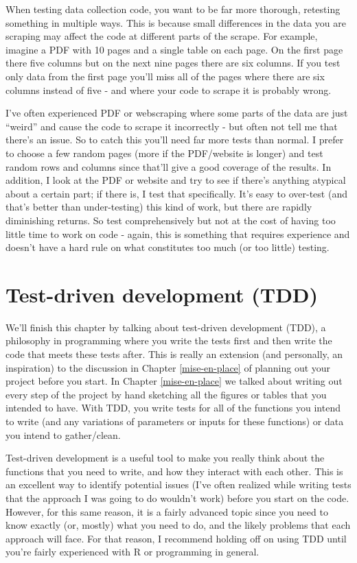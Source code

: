 \documentclass[
]{krantz}
\begin{document}
When testing data collection code, you want to be far more thorough, retesting something in multiple ways. This is because small differences in the data you are scraping may affect the code at different parts of the scrape. For example, imagine a PDF with 10 pages and a single table on each page. On the first page there five columns but on the next nine pages there are six columns. If you test only data from the first page you'll miss all of the pages where there are six columns instead of five - and where your code to scrape it is probably wrong.

I've often experienced PDF or webscraping where some parts of the data are just ``weird'' and cause the code to scrape it incorrectly - but often not tell me that there's an issue. So to catch this you'll need far more tests than normal. I prefer to choose a few random pages (more if the PDF/website is longer) and test random rows and columns since that'll give a good coverage of the results. In addition, I look at the PDF or website and try to see if there's anything atypical about a certain part; if there is, I test that specifically. It's easy to over-test (and that's better than under-testing) this kind of work, but there are rapidly diminishing returns. So test comprehensively but not at the cost of having too little time to work on code - again, this is something that requires experience and doesn't have a hard rule on what constitutes too much (or too little) testing.

\hypertarget{test-driven-development-tdd}{%
\section{Test-driven development (TDD)}\label{test-driven-development-tdd}}

We'll finish this chapter by talking about test-driven development (TDD), a philosophy in programming where you write the tests first and then write the code that meets these tests after. This is really an extension (and personally, an inspiration) to the discussion in Chapter \ref{mise-en-place} of planning out your project before you start. In Chapter \ref{mise-en-place} we talked about writing out every step of the project by hand sketching all the figures or tables that you intended to have. With TDD, you write tests for all of the functions you intend to write (and any variations of parameters or inputs for these functions) or data you intend to gather/clean.

Test-driven development is a useful tool to make you really think about the functions that you need to write, and how they interact with each other. This is an excellent way to identify potential issues (I've often realized while writing tests that the approach I was going to do wouldn't work) before you start on the code. However, for this same reason, it is a fairly advanced topic since you need to know exactly (or, mostly) what you need to do, and the likely problems that each approach will face. For that reason, I recommend holding off on using TDD until you're fairly experienced with R or programming in general.
\end{document}
